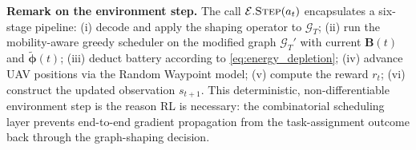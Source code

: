 \textbf{Remark on the environment step.}
The call $\mathcal{E}.\textsc{Step}(a_t)$ encapsulates a
six-stage pipeline:
(i) decode and apply the shaping operator to $\mathcal{G}_T$;
(ii) run the mobility-aware greedy scheduler on the modified
graph $\mathcal{G}_T'$ with current $\mathbf{B}(t)$
and $\tilde{\boldsymbol{\phi}}(t)$;
(iii) deduct battery according to \eqref{eq:energy_depletion};
(iv) advance UAV positions via the Random Waypoint model;
(v) compute the reward $r_t$;
(vi) construct the updated observation $s_{t+1}$.
This deterministic, non-differentiable environment step is the
reason RL is necessary: the combinatorial scheduling layer prevents
end-to-end gradient propagation from the task-assignment outcome
back through the graph-shaping decision.
